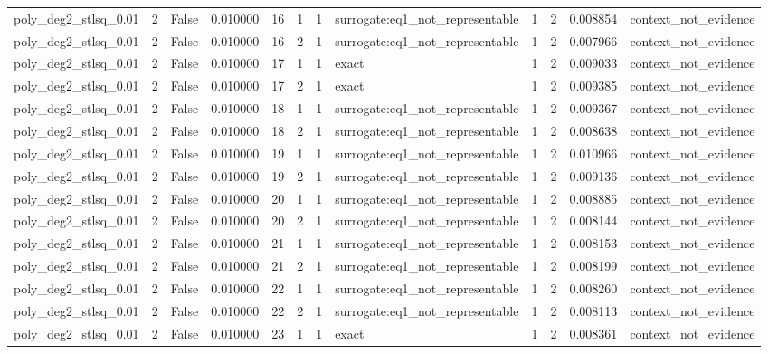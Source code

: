 \begin{tabular}{lrrrrrrlrrrl}
poly\_deg2\_stlsq\_0.01 & 2 & False & 0.010000 & 16 & 1 & 1 & surrogate:eq1\_not\_representable & 1 & 2 & 0.008854 & context\_not\_evidence \\
poly\_deg2\_stlsq\_0.01 & 2 & False & 0.010000 & 16 & 2 & 1 & surrogate:eq1\_not\_representable & 1 & 2 & 0.007966 & context\_not\_evidence \\
poly\_deg2\_stlsq\_0.01 & 2 & False & 0.010000 & 17 & 1 & 1 & exact & 1 & 2 & 0.009033 & context\_not\_evidence \\
poly\_deg2\_stlsq\_0.01 & 2 & False & 0.010000 & 17 & 2 & 1 & exact & 1 & 2 & 0.009385 & context\_not\_evidence \\
poly\_deg2\_stlsq\_0.01 & 2 & False & 0.010000 & 18 & 1 & 1 & surrogate:eq1\_not\_representable & 1 & 2 & 0.009367 & context\_not\_evidence \\
poly\_deg2\_stlsq\_0.01 & 2 & False & 0.010000 & 18 & 2 & 1 & surrogate:eq1\_not\_representable & 1 & 2 & 0.008638 & context\_not\_evidence \\
poly\_deg2\_stlsq\_0.01 & 2 & False & 0.010000 & 19 & 1 & 1 & surrogate:eq1\_not\_representable & 1 & 2 & 0.010966 & context\_not\_evidence \\
poly\_deg2\_stlsq\_0.01 & 2 & False & 0.010000 & 19 & 2 & 1 & surrogate:eq1\_not\_representable & 1 & 2 & 0.009136 & context\_not\_evidence \\
poly\_deg2\_stlsq\_0.01 & 2 & False & 0.010000 & 20 & 1 & 1 & surrogate:eq1\_not\_representable & 1 & 2 & 0.008885 & context\_not\_evidence \\
poly\_deg2\_stlsq\_0.01 & 2 & False & 0.010000 & 20 & 2 & 1 & surrogate:eq1\_not\_representable & 1 & 2 & 0.008144 & context\_not\_evidence \\
poly\_deg2\_stlsq\_0.01 & 2 & False & 0.010000 & 21 & 1 & 1 & surrogate:eq1\_not\_representable & 1 & 2 & 0.008153 & context\_not\_evidence \\
poly\_deg2\_stlsq\_0.01 & 2 & False & 0.010000 & 21 & 2 & 1 & surrogate:eq1\_not\_representable & 1 & 2 & 0.008199 & context\_not\_evidence \\
poly\_deg2\_stlsq\_0.01 & 2 & False & 0.010000 & 22 & 1 & 1 & surrogate:eq1\_not\_representable & 1 & 2 & 0.008260 & context\_not\_evidence \\
poly\_deg2\_stlsq\_0.01 & 2 & False & 0.010000 & 22 & 2 & 1 & surrogate:eq1\_not\_representable & 1 & 2 & 0.008113 & context\_not\_evidence \\
poly\_deg2\_stlsq\_0.01 & 2 & False & 0.010000 & 23 & 1 & 1 & exact & 1 & 2 & 0.008361 & context\_not\_evidence \\

\end{tabular}
